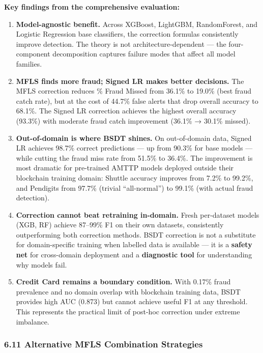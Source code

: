 \documentclass[
  11pt,
]{article}
\begin{document}
\textbf{Key findings from the comprehensive evaluation:}

\begin{enumerate}
\def\labelenumi{\arabic{enumi}.}
\item
  \textbf{Model-agnostic benefit.} Across XGBoost, LightGBM,
  RandomForest, and Logistic Regression base classifiers, the correction
  formulas consistently improve detection. The theory is not
  architecture-dependent — the four-component decomposition captures
  failure modes that affect all model families.
\item
  \textbf{MFLS finds more fraud; Signed LR makes better decisions.} The
  MFLS correction reduces \% Fraud Missed from 36.1\% to 19.0\% (best
  fraud catch rate), but at the cost of 44.7\% false alerts that drop
  overall accuracy to 68.1\%. The Signed LR correction achieves the
  highest overall accuracy (93.3\%) with moderate fraud catch
  improvement (36.1\% → 30.1\% missed).
\item
  \textbf{Out-of-domain is where BSDT shines.} On out-of-domain data,
  Signed LR achieves 98.7\% correct predictions — up from 90.3\% for
  base models — while cutting the fraud miss rate from 51.5\% to 36.4\%.
  The improvement is most dramatic for pre-trained AMTTP models deployed
  outside their blockchain training domain: Shuttle accuracy improves
  from 7.2\% to 99.2\%, and Pendigits from 97.7\% (trivial “all-normal”)
  to 99.1\% (with actual fraud detection).
\item
  \textbf{Correction cannot beat retraining in-domain.} Fresh
  per-dataset models (XGB, RF) achieve 87–99\% F1 on their own datasets,
  consistently outperforming both correction methods. BSDT correction is
  not a substitute for domain-specific training when labelled data is
  available — it is a \textbf{safety net} for cross-domain deployment
  and a \textbf{diagnostic tool} for understanding why models fail.
\item
  \textbf{Credit Card remains a boundary condition.} With 0.17\% fraud
  prevalence and no domain overlap with blockchain training data, BSDT
  provides high AUC (0.873) but cannot achieve useful F1 at any
  threshold. This represents the practical limit of post-hoc correction
  under extreme imbalance.
\end{enumerate}

\subsubsection{6.11 Alternative MFLS Combination
Strategies}\label{alternative-mfls-combination-strategies}
\end{document}

